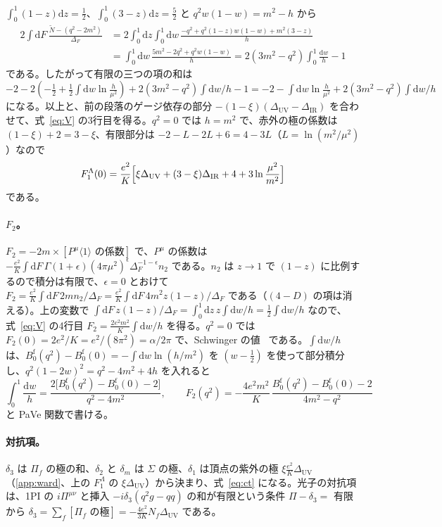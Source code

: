 \documentclass[a4paper,10pt]{ltjsarticle}
\newcommand{\dd}{\mathrm{d}}
\newcommand{\DUV}{\Delta_{\mathrm{UV}}}
\newcommand{\DIR}{\Delta_{\mathrm{IR}}}
\newcommand{\sw}[1]{\langle #1\rangle}
\begin{document}
$\int_0^1(1-z)\dd z=\frac12$、$\int_0^1(3-z)\dd z=\frac52$ と $q^2w(1-w)=m^2-h$ から
\begin{equation*}
\begin{aligned}
2\int\dd F\,\frac{\tilde N-(q^2-2m^2)}{\Delta_F}&=2\int_0^1\dd z\int_0^1\dd w\,\frac{-q^2+q^2(1-z)w(1-w)+m^2(3-z)}{h}\\
&=\int_0^1\dd w\,\frac{5m^2-2q^2+q^2w(1-w)}{h}=2(3m^2-q^2)\int_0^1\frac{\dd w}{h}-1
\end{aligned}
\end{equation*}
である。したがって有限の三つの項の和は $-2-2(-\frac12+\frac12\int\dd w\ln\frac h{\mu^2})+2(3m^2-q^2)\int\dd w/h-1=-2-\int\dd w\ln\frac h{\mu^2}+2(3m^2-q^2)\int\dd w/h$ になる。以上と、前の段落のゲージ依存の部分 $-(1-\xi)(\DUV-\DIR)$ を合わせて、式~\eqref{eq:V} の3行目を得る。$q^2=0$ では $h=m^2$ で、赤外の極の係数は $(1-\xi)+2=3-\xi$、有限部分は $-2-L-2L+6=4-3L$（$L=\ln(m^2/\mu^2)$）なので
\begin{equation*}
F_1^\Lambda(0)=\frac{e^2}{K}\Bigl[\xi\DUV+(3-\xi)\DIR+4+3\ln\frac{\mu^2}{m^2}\Bigr]
\end{equation*}
である。

\paragraph{$F_2$。}$F_2=-2m\times[P^\mu\sw1\text{ の係数}]$ で、$P^\mu$ の係数は $-\frac{e^2}{K}\int\dd F\,\Gamma(1+\epsilon)(4\pi\mu^2)^\epsilon\Delta_F^{-1-\epsilon}n_2$ である。$n_2$ は $z\to1$ で $(1-z)$ に比例するので積分は有限で、$\epsilon=0$ とおけて $F_2=\frac{e^2}{K}\int\dd F\,2mn_2/\Delta_F=\frac{e^2}{K}\int\dd F\,4m^2z(1-z)/\Delta_F$ である（$(4-D)$ の項は消える）。上の変数で $\int\dd F\,z(1-z)/\Delta_F=\int_0^1\dd z\,z\int\dd w/h=\frac12\int\dd w/h$ なので、式~\eqref{eq:V} の4行目 $F_2=\frac{2e^2m^2}{K}\int\dd w/h$ を得る。$q^2=0$ では $F_2(0)=2e^2/K=e^2/(8\pi^2)=\alpha/2\pi$ で、Schwinger の値~\cite{schwinger48} である。$\int\dd w/h$ は、$B_0^{\mathrm f}(q^2)-B_0^{\mathrm f}(0)=-\int\dd w\ln(h/m^2)$ を $(w-\frac12)$ を使って部分積分し、$q^2(1-2w)^2=q^2-4m^2+4h$ を入れると
\begin{equation*}
\int_0^1\frac{\dd w}{h}=\frac{2\bigl[B_0^{\mathrm f}(q^2)-B_0^{\mathrm f}(0)-2\bigr]}{q^2-4m^2},\qquad
F_2(q^2)=-\frac{4e^2m^2}{K}\,\frac{B_0^{\mathrm f}(q^2)-B_0^{\mathrm f}(0)-2}{4m^2-q^2}
\end{equation*}
と PaVe 関数で書ける。

\paragraph{対抗項。}$\delta_3$ は $\Pi_f$ の極の和、$\delta_2$ と $\delta_m$ は $\Sigma$ の極、$\delta_1$ は頂点の紫外の極 $\xi\frac{e^2}{K}\DUV$（\ref{app:ward}、上の $F_1^\Lambda$ の $\xi\DUV$）から決まり、式~\eqref{eq:ct} になる。光子の対抗項は、1PI の $i\Pi^{\mu\nu}$ と挿入 $-i\delta_3(q^2g-qq)$ の和が有限という条件 $\Pi-\delta_3=$ 有限 から $\delta_3=\sum_f[\Pi_f\text{ の極}]=-\frac{4e^2}{3K}N_f\DUV$ である。
\end{document}
